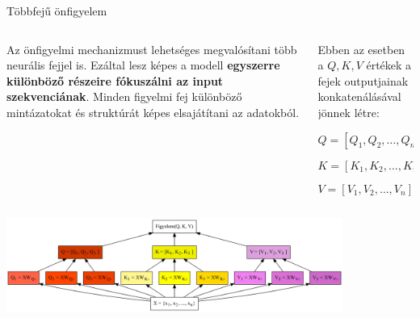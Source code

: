 \documentclass[english, aspectratio=169]{beamer}
\begin{document}
\begin{frame}{Többfejű önfigyelem}
\begin{columns}
\begin{column}{.4\textwidth}
Az önfigyelmi mechanizmust lehetséges megvalósítani több neurális fejjel is. Ezáltal lesz képes a modell \textbf{egyszerre különböző részeire fókuszálni az input szekvenciának}. Minden figyelmi fej különböző mintázatokat és struktúrát képes elsajátítani az adatokból. 
\end{column}
\begin{column}{.6\textwidth}
Ebben az esetben a $Q,K,V$ értékek a fejek outputjainak konkatenálásával jönnek létre:
\begin{block}{}
\vspace{-0.2cm}
\[
Q=\left[ Q_1,Q_2,\ldots,Q_n \right]
\]
\end{block}
\vspace{-0.2cm}
\begin{block}{}
\vspace{-0.2cm}
\[
K=\left[ K_1,K_2,\ldots,K_n \right]
\]
\end{block}
\vspace{-0.2cm}
\begin{block}{}
\vspace{-0.2cm}
\[
V=\left[ V_1,V_2,\ldots,V_n \right]
\]
\end{block}
\end{column}
\end{columns}
\begin{center}
\includegraphics[width=11cm, keepaspectratio]{graphs/transformer_19.png}
\end{center}
\end{frame}
\end{document}
